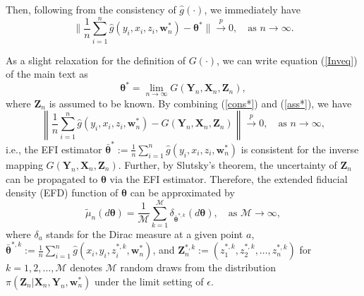\documentclass[11pt]{article}
\newcommand{\bX}{{\boldsymbol X}}
\newcommand{\bY}{{\boldsymbol Y}}
\newcommand{\by}{{\boldsymbol y}}
\newcommand{\bx}{{\boldsymbol x}}
\newcommand{\bz}{{\boldsymbol z}}
\newcommand{\bZ}{{\boldsymbol Z}}
\newcommand{\bw}{{\boldsymbol w}}
\newcommand{\mM}{\mathcal{M}}
\newcommand{\btheta}{{\boldsymbol \theta}}
\begin{document}
Then, following from the consistency of $\hat{g}(\cdot)$, we immediately have 
 \begin{equation} \label{cons*}
 \| \frac{1}{n} \sum_{i=1}^n \hat{g}(y_i,x_i, z_i,
 \bw_n^*)-\btheta^*\| \stackrel{p}{\to} 0, \quad \mbox{as $n\to \infty$}.
 \end{equation}

As a slight relaxation for the definition of $G(\cdot)$,  we can write equation (\ref{Inveq}) of the main text as 
\begin{equation} \label{ass*}
\btheta^*=\lim_{n\to \infty} G(\bY_n,\bX_n,\bZ_n),
\end{equation}
where $\bZ_n$ is assumed to be known.
By combining (\ref{cons*}) and (\ref{ass*}),  we have
\[
\left\| \frac{1}{n} \sum_{i=1}^n \hat{g}(y_i,x_i, z_i, \bw_n^*)-G(\bY_n,\bX_n,\bZ_n)\right\| \stackrel{p}{\to} 0, \quad \mbox{as $n\to \infty$},
\]
i.e., the EFI estimator $\bar{\btheta}^*:=\frac{1}{n} \sum_{i=1}^n \hat{g}(y_i,x_i, z_i, \bw_n^*)$ is consistent for the inverse mapping $G(\bY_n,\bX_n,\bZ_n)$.  
Further, by Slutsky's theorem, the uncertainty of $\bZ_n$ can be propagated to $\btheta$ via
the EFI estimator. Therefore, 
the extended fiducial density (EFD) function  of $\btheta$ can be approximated by 
\begin{equation} \label{CDestimator}
\tilde{\mu}_n(d\btheta)= \frac{1}{\mM} \sum_{k=1}^{\mM} \delta_{\bar{\btheta}^{*,k}} (d\btheta), \quad \mbox{as $\mM\to \infty$},
\end{equation}
where $\delta_a$ stands for the Dirac measure at a given point $a$, 
$\bar{\btheta}^{*,k}:= \frac{1}{n} \sum_{i=1}^n \hat{g}(x_i,y_i, z_{i}^{*,k}, \bw_n^*)$, and 
$\bZ_n^{*,k}:=(z_1^{*,k},z_2^{*,k},\ldots,z_n^{*,k})$ for $k=1,2,\ldots, \mM$ 
denotes $\mM$ random draws from the distribution 
$\pi(\bZ_n|\bX_n,\bY_n,\bw_n^*)$ under the limit setting of $\epsilon$.
\end{document}
